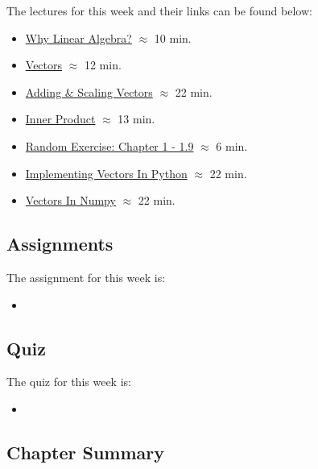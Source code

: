 The lectures for this week and their links can be found below:

\begin{itemize}
    \item \href{https://applied.cs.colorado.edu/mod/hvp/view.php?id=50664}{Why Linear Algebra?} $\approx$ 10 min.
    \item \href{https://applied.cs.colorado.edu/mod/hvp/view.php?id=50666}{Vectors} $\approx$ 12 min.
    \item \href{https://applied.cs.colorado.edu/mod/hvp/view.php?id=50667}{Adding \& Scaling Vectors} $\approx$ 22 min.
    \item \href{https://applied.cs.colorado.edu/mod/hvp/view.php?id=50668}{Inner Product} $\approx$ 13 min.
    \item \href{https://applied.cs.colorado.edu/mod/hvp/view.php?id=50669}{Random Exercise: Chapter 1 - 1.9} $\approx$ 6 min.
    \item \href{https://applied.cs.colorado.edu/mod/hvp/view.php?id=50670}{Implementing Vectors In Python} $\approx$ 22 min.
    \item \href{https://applied.cs.colorado.edu/mod/hvp/view.php?id=50671}{Vectors In Numpy} $\approx$ 22 min.
\end{itemize}

\subsection{Assignments}

The assignment for this week is:

\begin{itemize}
    \item {}
\end{itemize}

\subsection{Quiz}

The quiz for this week is:

\begin{itemize}
    \item {}
\end{itemize}

\newpage

\subsection{Chapter Summary}

